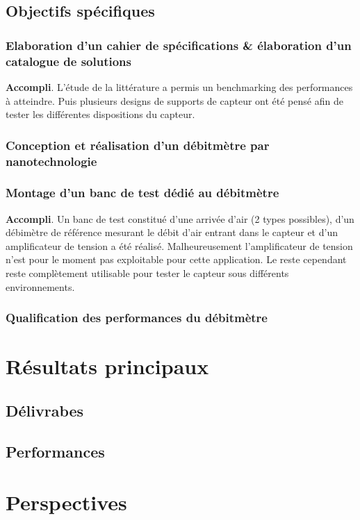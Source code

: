 \subsection{Objectifs spécifiques}
\subsubsection{Elaboration d’un cahier de spécifications \& élaboration d’un catalogue de solutions}
\textbf{Accompli}. L'étude de la littérature a permis un benchmarking des performances à atteindre. Puis plusieurs designs de supports de capteur 
ont été pensé afin de tester les différentes dispositions du capteur. 

\subsubsection{Conception et réalisation d’un débitmètre par nanotechnologie}


\subsubsection{Montage d’un banc de test dédié au débitmètre}
\textbf{Accompli}. Un banc de test constitué d'une arrivée d'air (2 types possibles), d'un débimètre de référence mesurant le débit d'air entrant 
dans le capteur et d'un amplificateur de tension a été réalisé. Malheureusement l'amplificateur de tension n'est pour le moment pas exploitable 
pour cette application. Le reste cependant reste complètement utilisable pour tester le capteur sous différents environnements. 

\subsubsection{Qualification des performances du débitmètre}

\section{Résultats principaux}
\subsection{Délivrabes}
\subsection{Performances}
\section{Perspectives}
